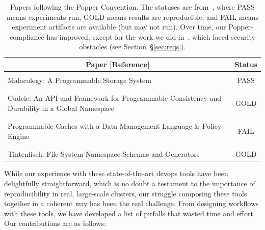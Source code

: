 \begin{table}[t]
\centering
\normalsize
\begin{tabular}{ >{}m{2.8in} | c }
\multicolumn{1}{c|}{Paper [Reference]} & Status \\ \hline
&\\
Malacology: A Programmable Storage System~\cite{sevilla:eurosys17-malacology} & PASS\\ 
&\\\hdashline
&\\
Cudele: An API and Framework for Programmable Consistency and Durability in a Global Namespace~\cite{sevilla:ipdps18-cudele} & GOLD \\
&\\\hdashline
&\\
Programmable Caches with a Data Management Language \& Policy Engine~\cite{sevilla:ccgrid18-parsplice} & FAIL \\
&\\\hdashline
&\\
Tintenfisch: File System Namespace Schemas and Generators~\cite{sevilla:techreport18-tintenfisch} & GOLD \\
\end{tabular}

\caption{Papers following the Popper Convention. The statuses are
from~\cite{jimenez:rr18-popper}, where PASS means experiments run, GOLD means
results are reproducible, and FAIL means experiment artifacts are available
(but may not run). Over time, our Popper-compliance has improved, except for
the work we did in~\cite{sevilla:ccgrid18-parsplice}, which faced security
obstacles (see Section~\S\ref{sec:reqs}).}

\label{table:papers}
\end{table}

While our experience with these state-of-the-art
devops tools have been delightfully straightforward, which is no doubt a
testament to the importance of reproducibility in real, large-scale clusters,
our struggle composing these tools together in a coherent way has been the real
challenge.  From designing workflows with these tools, we have developed a list
of pitfalls that wasted time and effort. Our contributions are as follows:

